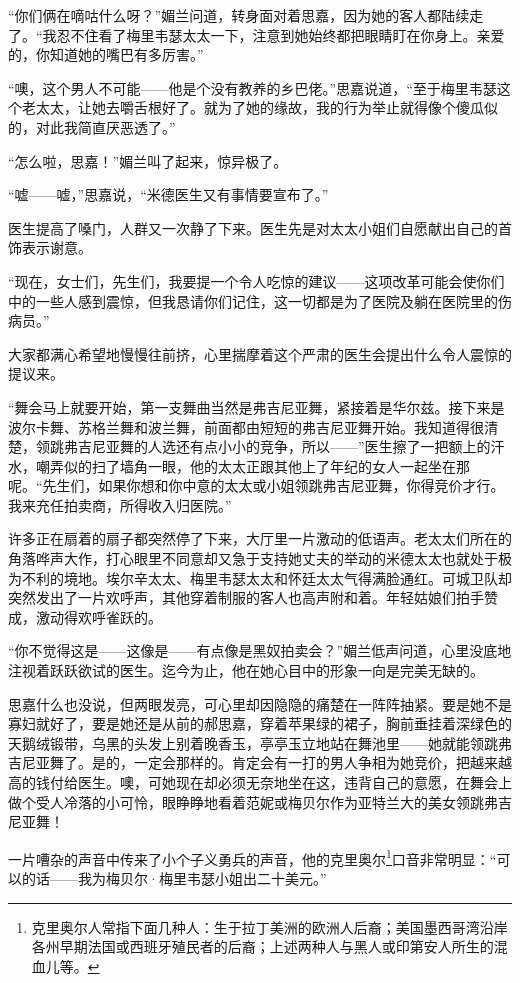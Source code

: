 \par “你们俩在嘀咕什么呀？”媚兰问道，转身面对着思嘉，因为她的客人都陆续走了。“我忍不住看了梅里韦瑟太太一下，注意到她始终都把眼睛盯在你身上。亲爱的，你知道她的嘴巴有多厉害。”
\par “噢，这个男人不可能——他是个没有教养的乡巴佬。”思嘉说道，“至于梅里韦瑟这个老太太，让她去嚼舌根好了。就为了她的缘故，我的行为举止就得像个傻瓜似的，对此我简直厌恶透了。”
\par “怎么啦，思嘉！”媚兰叫了起来，惊异极了。
\par “嘘——嘘，”思嘉说，“米德医生又有事情要宣布了。”
\par 医生提高了嗓门，人群又一次静了下来。医生先是对太太小姐们自愿献出自己的首饰表示谢意。
\par “现在，女士们，先生们，我要提一个令人吃惊的建议——这项改革可能会使你们中的一些人感到震惊，但我恳请你们记住，这一切都是为了医院及躺在医院里的伤病员。”
\par 大家都满心希望地慢慢往前挤，心里揣摩着这个严肃的医生会提出什么令人震惊的提议来。
\par “舞会马上就要开始，第一支舞曲当然是弗吉尼亚舞，紧接着是华尔兹。接下来是波尔卡舞、苏格兰舞和波兰舞，前面都由短短的弗吉尼亚舞开始。我知道得很清楚，领跳弗吉尼亚舞的人选还有点小小的竞争，所以——”医生擦了一把额上的汗水，嘲弄似的扫了墙角一眼，他的太太正跟其他上了年纪的女人一起坐在那呢。“先生们，如果你想和你中意的太太或小姐领跳弗吉尼亚舞，你得竞价才行。我来充任拍卖商，所得收入归医院。”
\par 许多正在扇着的扇子都突然停了下来，大厅里一片激动的低语声。老太太们所在的角落哗声大作，打心眼里不同意却又急于支持她丈夫的举动的米德太太也就处于极为不利的境地。埃尔辛太太、梅里韦瑟太太和怀廷太太气得满脸通红。可城卫队却突然发出了一片欢呼声，其他穿着制服的客人也高声附和着。年轻姑娘们拍手赞成，激动得欢呼雀跃的。
\par “你不觉得这是——这像是——有点像是黑奴拍卖会？”媚兰低声问道，心里没底地注视着跃跃欲试的医生。迄今为止，他在她心目中的形象一向是完美无缺的。
\par 思嘉什么也没说，但两眼发亮，可心里却因隐隐的痛楚在一阵阵抽紧。要是她不是寡妇就好了，要是她还是从前的郝思嘉，穿着苹果绿的裙子，胸前垂挂着深绿色的天鹅绒锻带，乌黑的头发上别着晚香玉，亭亭玉立地站在舞池里——她就能领跳弗吉尼亚舞了。是的，一定会那样的。肯定会有一打的男人争相为她竞价，把越来越高的钱付给医生。噢，可她现在却必须无奈地坐在这，违背自己的意愿，在舞会上做个受人冷落的小可怜，眼睁睁地看着范妮或梅贝尔作为亚特兰大的美女领跳弗吉尼亚舞！
\par 一片嘈杂的声音中传来了小个子义勇兵的声音，他的克里奥尔\footnote{克里奥尔人常指下面几种人：生于拉丁美洲的欧洲人后裔；美国墨西哥湾沿岸各州早期法国或西班牙殖民者的后裔；上述两种人与黑人或印第安人所生的混血儿等。}口音非常明显：“可以的话——我为梅贝尔·梅里韦瑟小姐出二十美元。”
